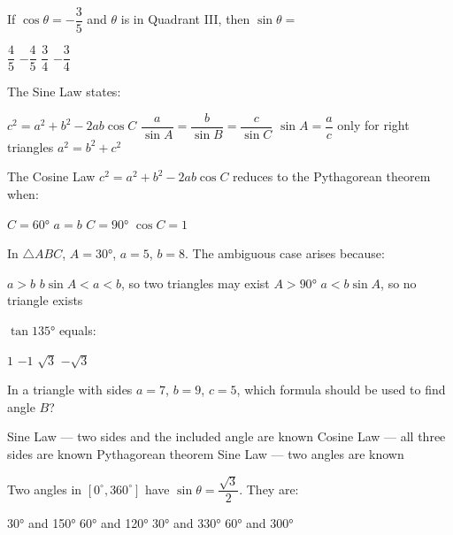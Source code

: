 \documentclass[addpoints]{exam}
\begin{document}
\begin{questions}
\question[1] If $\cos\theta = -\dfrac{3}{5}$ and $\theta$ is in Quadrant III, then
$\sin\theta =$
\begin{choices}
    \choice $\dfrac{4}{5}$
    \correctchoice $-\dfrac{4}{5}$
    \choice $\dfrac{3}{4}$
    \choice $-\dfrac{3}{4}$
\end{choices}

\question[1] The Sine Law states:
\begin{choices}
    \choice $c^2 = a^2 + b^2 - 2ab\cos C$
    \correctchoice $\dfrac{a}{\sin A} = \dfrac{b}{\sin B} = \dfrac{c}{\sin C}$
    \choice $\sin A = \dfrac{a}{c}$ only for right triangles
    \choice $a^2 = b^2 + c^2$
\end{choices}

\question[1] The Cosine Law $c^2 = a^2 + b^2 - 2ab\cos C$ reduces to the Pythagorean
theorem when:
\begin{choices}
    \choice $C = \ang{60}$
    \choice $a = b$
    \correctchoice $C = \ang{90}$
    \choice $\cos C = 1$
\end{choices}

\question[1] In $\triangle ABC$, $A = \ang{30}$, $a = 5$, $b = 8$. The ambiguous case arises
because:
\begin{choices}
    \choice $a > b$
    \correctchoice $b\sin A < a < b$, so two triangles may exist
    \choice $A > \ang{90}$
    \choice $a < b\sin A$, so no triangle exists
\end{choices}

\question[1] $\tan\ang{135}$ equals:
\begin{choices}
    \choice $1$
    \correctchoice $-1$
    \choice $\sqrt{3}$
    \choice $-\sqrt{3}$
\end{choices}

\question[1] In a triangle with sides $a = 7$, $b = 9$, $c = 5$, which formula
should be used to find angle $B$?
\begin{choices}
    \choice Sine Law — two sides and the included angle are known
    \correctchoice Cosine Law — all three sides are known
    \choice Pythagorean theorem
    \choice Sine Law — two angles are known
\end{choices}

\question[1] Two angles in $[0^\circ, 360^\circ]$ have $\sin\theta = \dfrac{\sqrt{3}}{2}$.
They are:
\begin{choices}
    \choice \ang{30} and \ang{150}
    \correctchoice \ang{60} and \ang{120}
    \choice \ang{30} and \ang{330}
    \choice \ang{60} and \ang{300}
\end{choices}


\end{questions}
\end{document}

